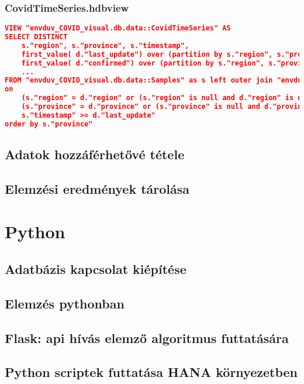 \documentclass[12pt,a4papaer]{article}
\begin{document}
    \subsubsection{CovidTimeSeries.hdbview}
    \begin{lstlisting}[language=json]
VIEW "envduv_COVID_visual.db.data::CovidTimeSeries" AS
SELECT DISTINCT
	s."region", s."province", s."timestamp", 
	first_value( d."last_update") over (partition by s."region", s."province", s."timestamp" order by d."last_update" desc) as "last_update",
    first_value( d."confirmed") over (partition by s."region", s."province", s."timestamp" order by d."last_update" desc) as "confirmed",
    ...
FROM "envduv_COVID_visual.db.data::Samples" as s left outer join "envduv_COVID_visual.db.data::Covid_raw" d
on 
	(s."region" = d."region" or (s."region" is null and d."region" is null)) and 
	(s."province" = d."province" or (s."province" is null and d."province" is null)) and 
	s."timestamp" >= d."last_update"
order by s."province"
    \end{lstlisting}

    \subsection{Adatok hozzáférhetővé tétele}
    \subsection{Elemzési eredmények tárolása}
    \newpage
    \section{Python}
    \subsection{Adatbázis kapcsolat kiépítése}
    \subsection{Elemzés pythonban}
    \subsection{Flask: api hívás elemző algoritmus futtatására}
    \subsection{Python scriptek futtatása HANA környezetben}
\end{document}
